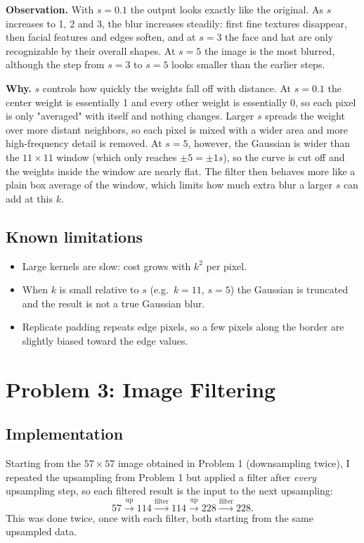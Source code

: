 \documentclass[11pt]{article}
\begin{document}
\textbf{Observation.} With $s = 0.1$ the output looks exactly like the
original. As $s$ increases to 1, 2 and 3, the blur increases steadily: first
fine textures disappear, then facial features and edges soften, and at
$s = 3$ the face and hat are only recognizable by their overall shapes. At
$s = 5$ the image is the most blurred, although the step from $s = 3$ to
$s = 5$ looks smaller than the earlier steps.

\textbf{Why.} $s$ controls how quickly the weights fall off with distance.
At $s = 0.1$ the center weight is essentially 1 and every other weight is
essentially 0, so each pixel is only "averaged" with itself and nothing
changes. Larger $s$ spreads the weight over more distant neighbors, so each
pixel is mixed with a wider area and more high-frequency detail is removed.
At $s = 5$, however, the Gaussian is wider than the $11 \times 11$ window
(which only reaches $\pm 5 = \pm 1s$), so the curve is cut off and the
weights inside the window are nearly flat. The filter then behaves more like
a plain box average of the window, which limits how much extra blur a larger
$s$ can add at this $k$.

\subsection*{Known limitations}
\begin{itemize}
  \item Large kernels are slow: cost grows with $k^2$ per pixel.
  \item When $k$ is small relative to $s$ (e.g.\ $k = 11$, $s = 5$) the
        Gaussian is truncated and the result is not a true Gaussian blur.
  \item Replicate padding repeats edge pixels, so a few pixels along the
        border are slightly biased toward the edge values.
\end{itemize}


\section*{Problem 3: Image Filtering}

\subsection*{Implementation}
Starting from the $57 \times 57$ image obtained in Problem 1 (downsampling
twice), I repeated the upsampling from Problem 1 but applied a filter after
\emph{every} upsampling step, so each filtered result is the input to the
next upsampling:
\[
57 \xrightarrow{\text{up}} 114 \xrightarrow{\text{filter}} 114
   \xrightarrow{\text{up}} 228 \xrightarrow{\text{filter}} 228 .
\]
This was done twice, once with each filter, both starting from the same
upsampled data.
\end{document}
